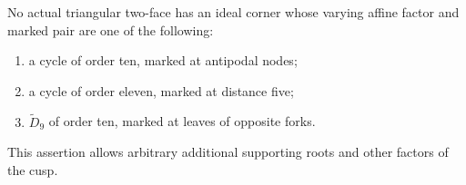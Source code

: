 \begin{lemma}
\label{lem:current-affine-triangle-exclusions}
No actual triangular two-face has an ideal corner whose varying affine
factor and marked pair are one of the following:
\begin{enumerate}
\item a cycle of order ten, marked at antipodal nodes;
\item a cycle of order eleven, marked at distance five;
\item $\widetilde D_9$ of order ten, marked at leaves of opposite forks.
\end{enumerate}
This assertion allows arbitrary additional supporting roots and other
factors of the cusp.
\end{lemma}
